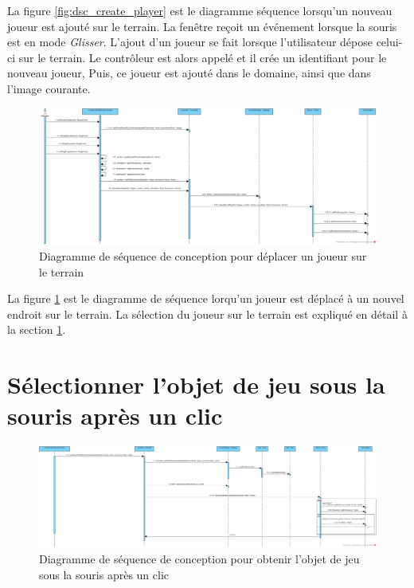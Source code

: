 La figure \ref{fig:dsc_create_player} est le diagramme séquence lorsqu'un nouveau joueur est ajouté sur le terrain.
La fenêtre reçoit un événement lorsque la souris est en mode \textit{Glisser}.
L'ajout d'un joueur se fait lorsque l'utilisateur dépose celui-ci sur le terrain.
Le contrôleur est alors appelé et il crée un identifiant pour le nouveau joueur,
Puis, ce joueur est ajouté dans le domaine, ainsi que dans l'image courante.


\begin{figure}[htpb]
    \centering
    \includegraphics[scale=0.3]{fig/dsc_drag_player.png}
    \caption{Diagramme de séquence de conception pour déplacer un joueur sur le terrain}
    \label{fig:dsc_drag_player}
\end{figure}

La figure \ref{fig:dsc_drag_player} est le diagramme de séquence lorqu'un joueur est déplacé à un nouvel endroit sur le terrain.
La sélection du joueur sur le terrain est expliqué en détail à la section \ref{sec:convertir_clic_en_objet}.

\section{Sélectionner l'objet de jeu sous la souris après un clic}
\label{sec:convertir_clic_en_objet}

\begin{figure}[htpb]
    \centering
    \includegraphics[scale=0.27]{fig/dsc_get_game_object_by_coordinate.png}
    \caption{Diagramme de séquence de conception pour obtenir l'objet de jeu sous la souris après un clic}
    \label{fig:dsc_get_game_object}
\end{figure}

